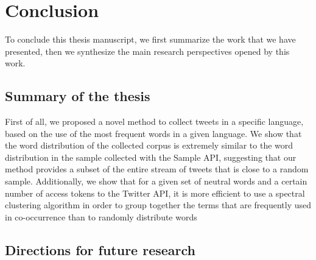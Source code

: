 \chapter{Conclusion}

To conclude this thesis manuscript, we first summarize the work that we have presented, then we synthesize the main research perspectives opened by this work.

\section{Summary of the thesis}

First of all, we proposed a novel method to collect tweets in a specific language, based on the use of the most frequent words in a given language. We show that the word distribution of the collected corpus is extremely similar to the word distribution in the sample collected with the Sample API, suggesting that our method provides a subset of the entire stream of tweets that is close to a random sample. Additionally, we show that for a given set of neutral words and a certain number of access tokens to the Twitter API, it is more efficient to use a spectral clustering algorithm in order to group together the terms that are frequently used in co-occurrence than to randomly distribute words 

\section{Directions for future research}